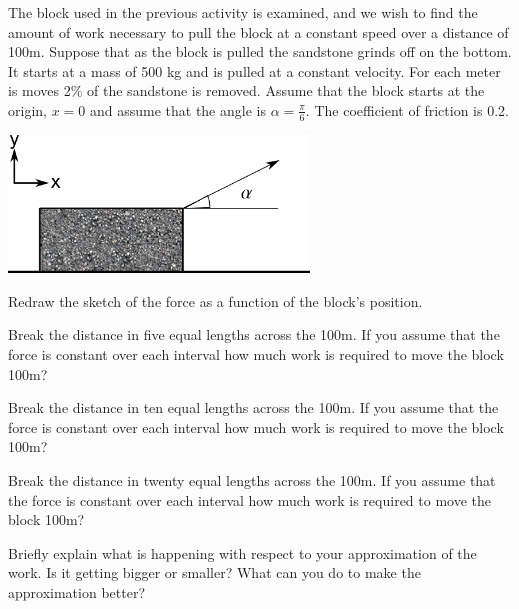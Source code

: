 \begin{problem}
\item The block used in the previous activity is examined, and we wish
  to find the amount of work necessary to pull the block at a constant
  speed over a distance of 100m.  Suppose that as the block is pulled
  the sandstone grinds off on the bottom. It starts at a mass of 500
  kg and is pulled at a constant velocity. For each meter is moves 2\%
  of the sandstone is removed. Assume that the block starts at the
  origin, $x=0$ and assume that the angle is
  $\alpha=\frac{\pi}{6}$. The coefficient of friction is 0.2.

  \includegraphics[width=8cm]{ink/week7/dragBlock}

  \begin{subproblem}
  \item Redraw the sketch of the force as a function of the block's
    position.

    \vfill

  \item Break the distance in five equal lengths across the 100m.  If
    you assume that the force is constant over each interval how much
    work is required to move the block 100m?

    \vfill

    \clearpage

  \item Break the distance in ten equal lengths across the 100m.  If
    you assume that the force is constant over each interval how much
    work is required to move the block 100m?

    \vfill

  \item Break the distance in twenty equal lengths across the 100m.  If
    you assume that the force is constant over each interval how much
    work is required to move the block 100m?

    \vfill

  \item Briefly explain what is happening with respect to your
    approximation of the work. Is it getting bigger or smaller? What
    can you do to make the approximation better?

    \vspace{3em}

  \end{subproblem}
\end{problem}

